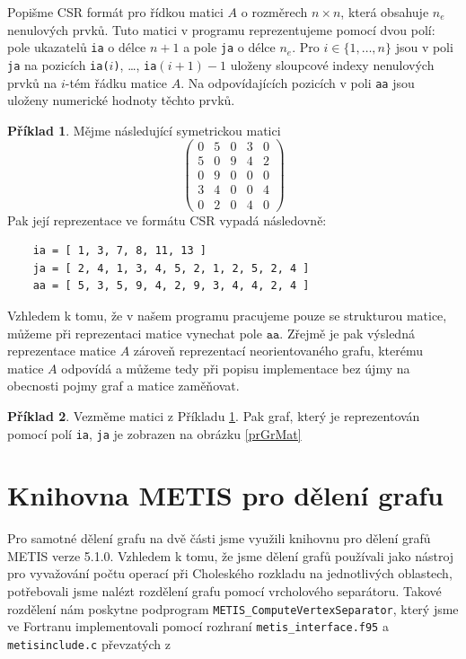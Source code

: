 \documentclass{ctuthesis}
\theoremstyle{plain}
\theoremstyle{definition}
\newtheorem{example}{Příklad}
\begin{document}
Popišme CSR formát pro řídkou matici $A$ o rozměrech $n \times n$, která obsahuje $n_e$ nenulových prvků. Tuto matici v programu reprezentujeme pomocí dvou polí: pole ukazatelů \texttt{ia} o délce $n+1$ a pole \texttt{ja} o délce $n_e$. Pro $i\in\{1,\ldots,n\}$ jsou v poli \texttt{ja} na pozicích \texttt{ia($i$)}, \ldots, \texttt{ia$(i+1)-1$} uloženy sloupcové indexy nenulových prvků na $i$-tém řádku matice $A$. Na odpovídajících pozicích v poli \texttt{aa} jsou uloženy numerické hodnoty těchto prvků.

\begin{example}
  \label{CSRexample}
  Mějme následující symetrickou matici
  \[
    \begin{pmatrix}
      0 & 5 & 0 & 3 & 0 \\
      5 & 0 & 9 & 4 & 2 \\
      0 & 9 & 0 & 0 & 0 \\
      3 & 4 & 0 & 0 & 4 \\
      0 & 2 & 0 & 4 & 0
    \end{pmatrix}
  \]
  Pak její reprezentace ve formátu CSR vypadá následovně:
  \begin{verbatim}
    ia = [ 1, 3, 7, 8, 11, 13 ]
    ja = [ 2, 4, 1, 3, 4, 5, 2, 1, 2, 5, 2, 4 ]
    aa = [ 5, 3, 5, 9, 4, 2, 9, 3, 4, 4, 2, 4 ]
  \end{verbatim}
\end{example}

Vzhledem k tomu, že v našem programu pracujeme pouze se strukturou matice, můžeme při reprezentaci matice vynechat pole $\texttt{aa}$. Zřejmě je pak výsledná reprezentace matice $A$ zároveň reprezentací neorientovaného grafu, kterému matice $A$ odpovídá a můžeme tedy při popisu implementace bez újmy na obecnosti pojmy graf a matice zaměňovat.

\begin{example}
  Vezměme matici z Příkladu \ref{CSRexample}. Pak graf, který je reprezentován pomocí polí \texttt{ia}, \texttt{ja} je zobrazen na obrázku \ref{prGrMat}
\end{example}

\section{Knihovna METIS pro dělení grafu}

Pro samotné dělení grafu na dvě části jsme využili knihovnu pro dělení grafů METIS \cite{kary:13} verze 5.1.0. Vzhledem k tomu, že jsme dělení grafů používali jako nástroj pro vyvažování počtu operací při Choleského rozkladu na jednotlivých oblastech, potřebovali jsme nalézt rozdělení grafu pomocí vrcholového separátoru. Takové rozdělení nám poskytne podprogram \texttt{METIS\_ComputeVertexSeparator}, který jsme ve Fortranu implementovali pomocí rozhraní \texttt{metis\_interface.f95} a \texttt{metisinclude.c} převzatých z \cite{klforum1}
\end{document}
